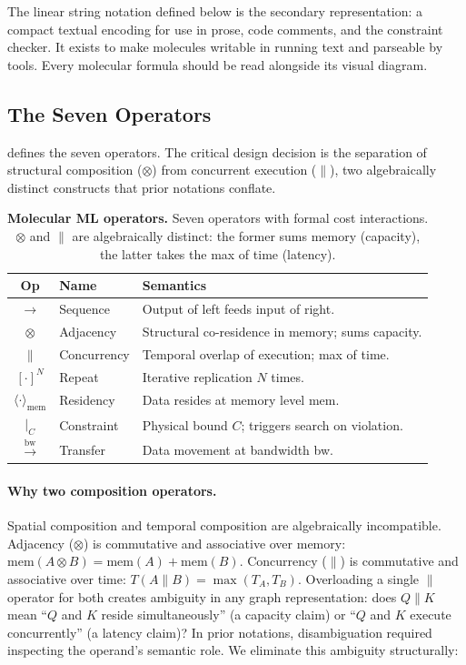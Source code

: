 \documentclass[10pt,twocolumn]{article}
\newcommand{\tablebody}{\footnotesize}
\begin{document}
The linear string notation defined below is the secondary representation: a compact textual encoding for use in prose, code comments, and the constraint checker. It exists to make molecules writable in running text and parseable by tools. Every molecular formula should be read alongside its visual diagram.

\subsection{The Seven Operators}

 defines the seven operators. The critical design decision is the separation of structural composition ($\otimes$) from concurrent execution ($\parallel$), two algebraically distinct constructs that prior notations conflate.

\begin{table}[ht]
\tablebody
\centering
\caption{\textbf{Molecular ML operators.} Seven operators with formal cost interactions. $\otimes$ and $\parallel$ are algebraically distinct: the former sums memory (capacity), the latter takes the max of time (latency).}
\label{tab:operators}
\begin{tabularx}{\columnwidth}{@{} c l X @{}}
\toprule
\textbf{Op} & \textbf{Name} & \textbf{Semantics} \\
\midrule
$\rightarrow$ & Sequence & Output of left feeds input of right. \\
$\otimes$ & Adjacency & Structural co-residence in memory; sums capacity. \\
$\parallel$ & Concurrency & Temporal overlap of execution; max of time. \\
$[\cdot]^N$ & Repeat & Iterative replication $N$ times. \\
$\langle \cdot \rangle_{\text{mem}}$ & Residency & Data resides at memory level mem. \\
$\mid_C$ & Constraint & Physical bound $C$; triggers search on violation. \\
$\xrightarrow{\text{bw}}$ & Transfer & Data movement at bandwidth bw. \\
\bottomrule
\end{tabularx}
\end{table}

\paragraph{Why two composition operators.} Spatial composition and temporal composition are algebraically incompatible. Adjacency ($\otimes$) is commutative and associative over memory: $\text{mem}(A \otimes B) = \text{mem}(A) + \text{mem}(B)$. Concurrency ($\parallel$) is commutative and associative over time: $T(A \parallel B) = \max(T_A, T_B)$. Overloading a single $\parallel$ operator for both creates ambiguity in any graph representation: does $Q \parallel K$ mean ``$Q$ and $K$ reside simultaneously'' (a capacity claim) or ``$Q$ and $K$ execute concurrently'' (a latency claim)? In prior notations, disambiguation required inspecting the operand's semantic role. We eliminate this ambiguity structurally:
\end{document}
